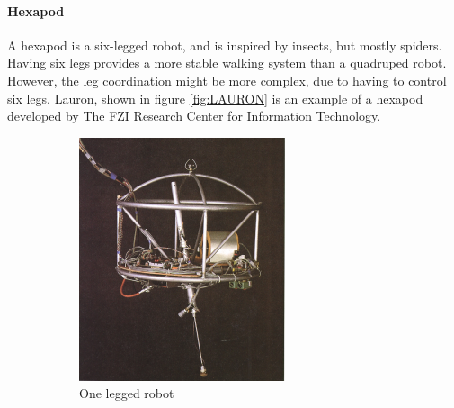 \documentclass[USenglish]{ifimaster}  %
\begin{document}
\paragraph{Hexapod}
A hexapod is a six-legged robot, and is inspired by insects, but mostly spiders. Having six legs provides a more stable walking system than a quadruped robot. However, the leg coordination might be more complex, due to having to control six legs. Lauron, shown in figure \ref{fig:LAURON} is an example of a hexapod developed by The FZI Research Center for Information Technology.

\begin{figure}
	\centering
	\begin{subfigure}[b]{0.22\textwidth}
		\centering
		\includegraphics[width=\linewidth]{Figures/Hopper}
		\caption{One legged robot \cite{Raibert:1986:LR:5948.5950}}
		\label{fig:onlegg}
	\end{subfigure}\hfill
	\begin{subfigure}[b]{0.22\textwidth}
		\centering

\end{subfigure}
\end{figure}
\end{document}
